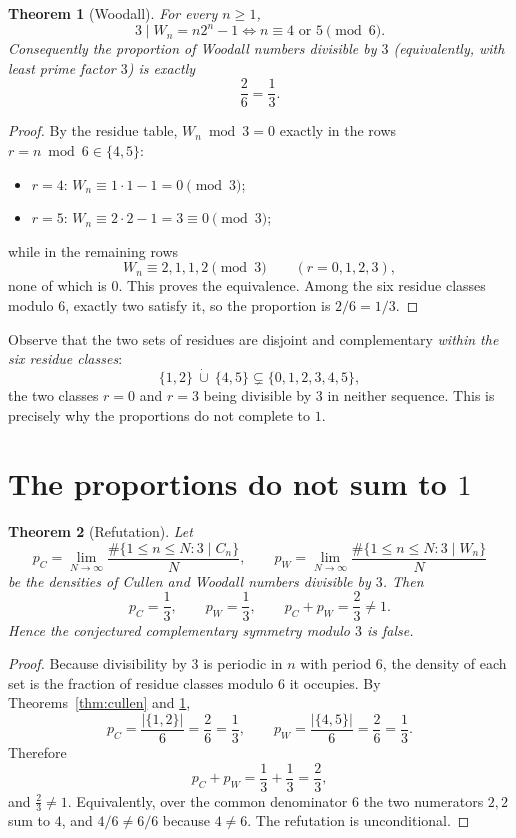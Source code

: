 \documentclass[11pt]{article}
\newtheorem{theorem}{Theorem}
\theoremstyle{definition}
\newcommand{\Cul}{C}
\newcommand{\Woo}{W}
\begin{document}
\begin{theorem}[Woodall]\label{thm:woodall}
For every \(n\ge 1\),
\[
3\mid \Woo_n = n2^n-1
\iff
n\equiv 4 \text{ or } 5 \pmod 6 .
\]
Consequently the proportion of Woodall numbers divisible by \(3\) (equivalently,
with least prime factor \(3\)) is exactly
\[
\frac{2}{6}=\frac13 .
\]
\end{theorem}

\begin{proof}
By the residue table, \(\Woo_n \bmod 3 = 0\) exactly in the rows
\(r=n\bmod 6\in\{4,5\}\):
\begin{itemize}
\item \(r=4\): \(\Woo_n\equiv 1\cdot 1-1 = 0\pmod 3\);
\item \(r=5\): \(\Woo_n\equiv 2\cdot 2-1 = 3\equiv 0\pmod 3\);
\end{itemize}
while in the remaining rows
\[
\Woo_n\equiv 2,1,1,2 \pmod 3
\qquad (r=0,1,2,3),
\]
none of which is \(0\). This proves the equivalence. Among the six residue
classes modulo \(6\), exactly two satisfy it, so the proportion is
\(2/6=1/3\).
\end{proof}

Observe that the two sets of residues are disjoint and complementary
\emph{within the six residue classes}:
\[
\{1,2\}\ \dot\cup\ \{4,5\} \subsetneq \{0,1,2,3,4,5\},
\]
the two classes \(r=0\) and \(r=3\) being divisible by \(3\) in neither
sequence. This is precisely why the proportions do not complete to \(1\).

\section{The proportions do not sum to \(1\)}

\begin{theorem}[Refutation]\label{thm:refute}
Let
\[
p_{\Cul} = \lim_{N\to\infty}\frac{\#\{1\le n\le N : 3\mid \Cul_n\}}{N},
\qquad
p_{\Woo} = \lim_{N\to\infty}\frac{\#\{1\le n\le N : 3\mid \Woo_n\}}{N}
\]
be the densities of Cullen and Woodall numbers divisible by \(3\). Then
\[
p_{\Cul} = \frac13, \qquad p_{\Woo} = \frac13, \qquad
p_{\Cul}+p_{\Woo} = \frac23 \neq 1 .
\]
Hence the conjectured complementary symmetry modulo \(3\) is false.
\end{theorem}

\begin{proof}
Because divisibility by \(3\) is periodic in \(n\) with period \(6\), the
density of each set is the fraction of residue classes modulo \(6\) it
occupies. By Theorems~\ref{thm:cullen} and \ref{thm:woodall},
\[
p_{\Cul} = \frac{|\{1,2\}|}{6} = \frac{2}{6} = \frac13,
\qquad
p_{\Woo} = \frac{|\{4,5\}|}{6} = \frac{2}{6} = \frac13 .
\]
Therefore
\[
p_{\Cul}+p_{\Woo} = \frac13+\frac13 = \frac23,
\]
and \(\tfrac23\neq 1\). Equivalently, over the common denominator \(6\) the
two numerators \(2,2\) sum to \(4\), and \(4/6 \neq 6/6\) because
\(4\neq 6\). The refutation is unconditional.
\end{proof}
\end{document}
